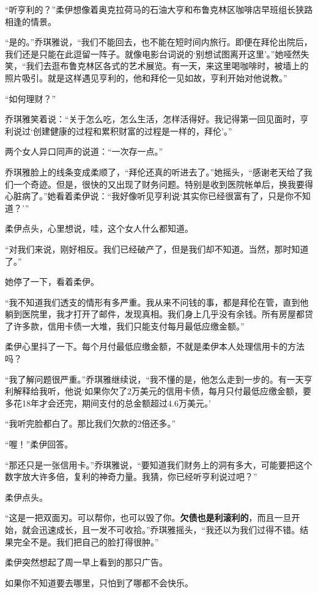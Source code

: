“听亨利的？”柔伊想像着奥克拉荷马的石油大亨和布鲁克林区咖啡店早班组长狭路相逢的情景。

“是的。”乔琪雅说，“我们不能回去，也不能在短时间内旅行。即便在拜伦出院后，我们还是只能在此逗留一阵子。就像电影台词说的‘别想试图离开这里’。”她哑然失笑，“我们去逛布鲁克林区各式的艺术展览。有一天，来这里喝咖啡时，被墙上的照片吸引。就是这样遇见亨利的，他和拜伦一见如故，亨利开始对他说教。”

“如何理财？”

乔琪雅笑着说：“关于怎么吃，怎么生活，怎样活得好。我记得第一回见面时，亨利说过‘创建健康的过程和累积财富的过程是一样的，拜伦’。”

两个女人异口同声的说道：“一次存一点。”

乔琪雅脸上的线条变成柔顺了，“拜伦还真的听进去了。”她摇头，“感谢老天给了我们一个奇迹。但是，很快的又出现了财务问题。特别是收到医院帐单后，换我要得心脏病了。”她看着柔伊说：“我好像听见亨利说‘其实你已经很富有了，只是你不知道？’”

柔伊点头，心里想说，哇，这个女人什么都知道。

“对我们来说，刚好相反。我们已经破产了，但是我们却不知道。当然，那时知道了。”

她停了一下，看着柔伊。

“我不知道我们透支的情形有多严重。我从来不问钱的事，都是拜伦在管，直到他躺到医院里，我才打开了邮件，发现真相。我们身上几乎没有余钱。所有房屋都贷了许多款，信用卡债一大堆，我们只能支付每月最低应缴金额。”

柔伊心里抖了一下。每个月付最低应缴金额，不就是柔伊本人处理信用卡的方法吗？

“我了解问题很严重。”乔琪雅继续说，“我不懂的是，他怎么走到一步的。有一天亨利解释给我听，他说‘如果你欠了2万美元的信用卡债，每月只付最低应缴金额，要多花18年才会还完，期间支付的总金额超过4.6万美元。’

“我听完脸都白了。那比我们欠款的2倍还多。”

“喔！”柔伊回答。

“那还只是一张信用卡。”乔琪雅说，“要知道我们财务上的洞有多大，可能要把这个数字放大许多倍，复利的神奇力量。我猜，你已经听亨利说过吧？”

柔伊点头。

“这是一把双面刃。可以帮你，也可以毁了你。\textbf{欠债也是利滚利的}，而且一旦开始，就会迅速成长，且一发不可收拾。”乔琪雅摇头，“我还以为我们过得不错。结果完全不是。我们把自己的脸打得很肿。”

柔伊突然想起了周一早上看到的那只广告。

{\kaishu 如果你不知道要去哪里，只怕到了哪都不会快乐。}

